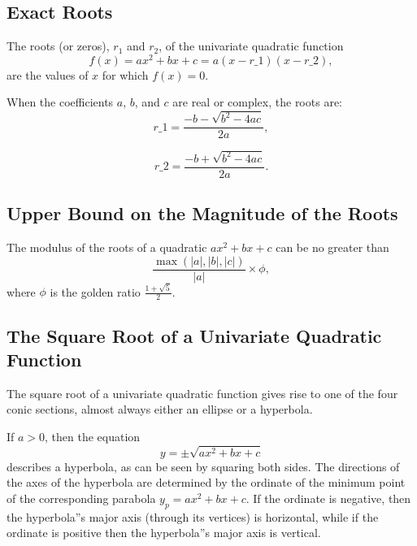 \subsection{Exact Roots}
\label{sss:exac-bff6}

The roots (or zeros), $r_1$ and $r_2$, of the univariate quadratic function
\[
f(x) = ax^2 + bx + c = a(x - r\_1)(x - r\_2),
\]
are the values of $x$ for which $f(x) = 0$.

When the coefficients $a$, $b$, and $c$ are real or complex, the roots are:
\[
r\_1 = \frac{-b - \sqrt{b^2 - 4ac}}{2a},
\]

\[
r\_2 = \frac{-b + \sqrt{b^2 - 4ac}}{2a}.
\]

\subsection{Upper Bound on the Magnitude of the Roots}
\label{sss:uppe-d41d}

The modulus of the roots of a quadratic $ax^2 + bx + c$ can be no greater than
\[
\frac{\max(|a|, |b|, |c|)}{|a|} \times \phi,
\]
where $\phi$ is the golden ratio $\frac{1 + \sqrt{5}}{2}$.

\subsection{The Square Root of a Univariate Quadratic Function}
\label{sss:thes-bc34}

The square root of a univariate quadratic function gives rise to one of the four conic
sections, almost always either an ellipse or a hyperbola.

If $a > 0$, then the equation
\[
y = \pm \sqrt{ax^2 + bx + c}
\]
describes a hyperbola, as can be seen by squaring both sides. The directions of the axes of the hyperbola are determined by the ordinate of the minimum point of the corresponding parabola $y_p = ax^2 + bx + c$. If the ordinate is negative, then the hyperbola''s major axis (through its vertices) is horizontal, while if the ordinate is positive then the hyperbola''s major axis is vertical.

